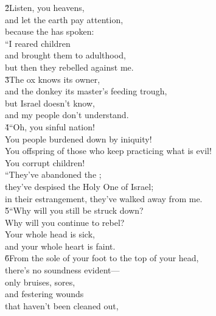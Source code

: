 \begin{poetry}
\poeml \v{2}Listen, you heavens, \\
\poemll    and let the earth pay attention, \\
\poemlll       because the  has spoken: \\
\poeml ``I reared children \\
\poemll    and brought them to adulthood, \\
\poemlll       but then they rebelled against me. \\
\poeml \v{3}The ox knows its owner, \\
\poemll    and the donkey its master's feeding trough, \\
\poeml but Israel doesn't know, \\
\poemll    and my people don't understand. \\
\poeml \v{4}``Oh, you sinful nation! \\
\poemll    You people burdened down by iniquity! \\
\poeml You offspring of those who keep practicing what is evil! \\
\poemll    You corrupt children! \\
\poeml ``They've abandoned the ; \\
\poemll    they've despised the Holy One of Israel; \\
\poemlll       in their estrangement, they've walked away from me. \\
\poeml \v{5}``Why will you still be struck down? \\
\poemll    Why will you continue to rebel? \\
\poeml Your whole head is sick, \\
\poemll    and your whole heart is faint. \\
\poeml \v{6}From the sole of your foot to the top of your head, \\
\poemll    there's no soundness evident--- \\
\poeml only bruises, sores, \\
\poemll    and festering wounds \\
\poeml that haven't been cleaned out, \\

\end{poetry}
